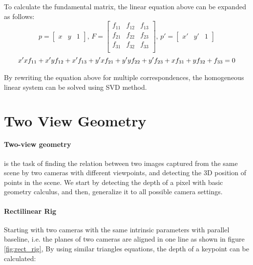 \documentclass[11pt]{article}
\begin{document}
    To calculate the fundamental matrix, the linear equation above can be expanded as follows:
    \begin{equation*}
        p =
        \begin{bmatrix}
            x & y & 1
        \end{bmatrix}
        \text{, }
        F =
        \begin{bmatrix}
        f_{11} & f_{12} & f_{13} \\
        f_{21} & f_{22} & f_{23} \\
        f_{31} & f_{32} & f_{33} \\
        \end{bmatrix}
        \text{, }
        p' =
        \begin{bmatrix}
            x' & y' & 1
        \end{bmatrix}
    \end{equation*}
    \begin{equation*}
        x'xf_{11} + x'yf_{12} + x'f_{13} + y'xf_{21} + y'yf_{22} + y'f_{23} + xf_{31} + yf_{32} + f_{33} = 0 \\
    \end{equation*}

    By rewriting the equation above for multiple correspondences, the homogeneous linear system can be solved using SVD method.

    \section{Two View Geometry}

    \paragraph{Two-view geometry} is the task of finding the relation between two images captured from the same scene
    by two cameras with different viewpoints, and detecting the 3D position of points in the scene. We start by
    detecting the depth of a pixel with basic geometry calculus, and then, generalize it to all possible camera settings.

    \paragraph{Rectilinear Rig} Starting with two cameras with the same intrinsic parameters with parallel baseline, i.e. the planes of
    two cameras are aligned in one line as shown in figure \ref{fig:rect_rig}, By using similar triangles equations,
    the depth of a keypoint can be calculated:
\end{document}
